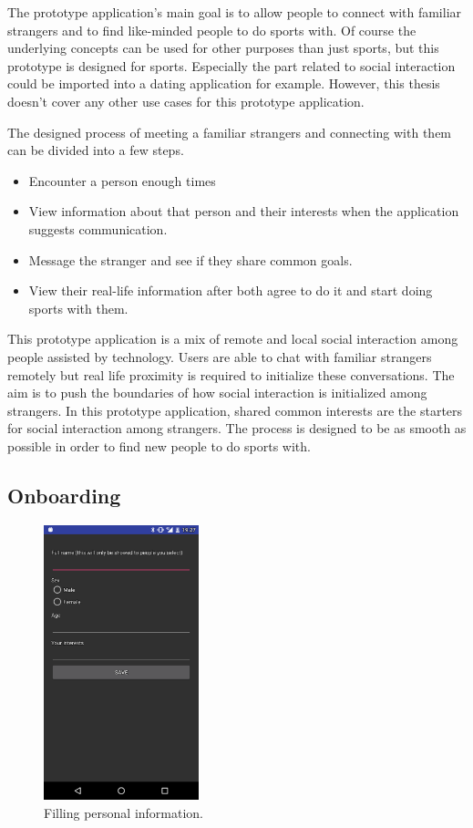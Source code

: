 The prototype application's main goal is to allow people to connect with familiar strangers and to find like-minded people to do sports with. Of course the underlying concepts can be used for other purposes than just sports, but this prototype is designed for sports. Especially the part related to social interaction could be imported into a dating application for example. However, this thesis doesn't cover any other use cases for this prototype application.

The designed process of meeting a familiar strangers and connecting with them can be divided into a few steps.

\begin{itemize}
	\item Encounter a person enough times
	\item View information about that person and their interests when the application suggests communication.
	\item Message the stranger and see if they share common goals.
	\item View their real-life information after both agree to do it and start doing sports with them.
\end{itemize}

This prototype application is a mix of remote and local social interaction among people assisted by technology. Users are able to chat with familiar strangers remotely but real life proximity is required to initialize these conversations. The aim is to push the boundaries of how social interaction is initialized among strangers. In this prototype application, shared common interests are the starters for social interaction among strangers. The process is designed to be as smooth as possible in order to find new people to do sports with.

\subsection{Onboarding}

\begin{figure}[htb]
	\begin{center}
		\includegraphics[width=0.4\textwidth]{onboarding2.png}
		\caption{Filling personal information.}
		\label{fig:fs_onboarding}
	\end{center}
\end{figure}

